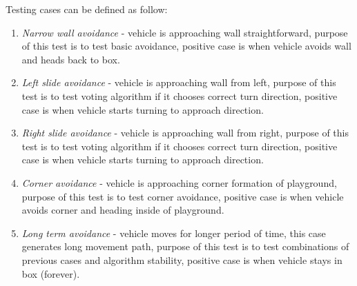 Testing cases can be defined as follow:
\begin{enumerate}
    \item \textit{Narrow wall avoidance} - vehicle is approaching wall straightforward, purpose of this test is to test basic avoidance, positive case is when vehicle avoids wall and heads back to box.
    \item \textit{Left slide avoidance} - vehicle is approaching wall from left, purpose of this test is to test voting algorithm if it chooses correct turn direction, positive case is when vehicle starts turning to approach direction.
    \item \textit{Right slide avoidance} - vehicle is approaching wall from right, purpose of this test is to test voting algorithm if it chooses correct turn direction, positive case is when vehicle starts turning to approach direction.
    \item \textit{Corner avoidance} - vehicle is approaching corner formation of playground, purpose of this test is to test corner avoidance, positive case is when vehicle avoids corner and heading inside of playground.
    \item \textit{Long term avoidance} - vehicle moves for longer period of time, this case generates long movement path, purpose of this test is to test combinations of previous cases and algorithm stability, positive case is when vehicle stays in box (forever).
\end{enumerate}

\newpage
